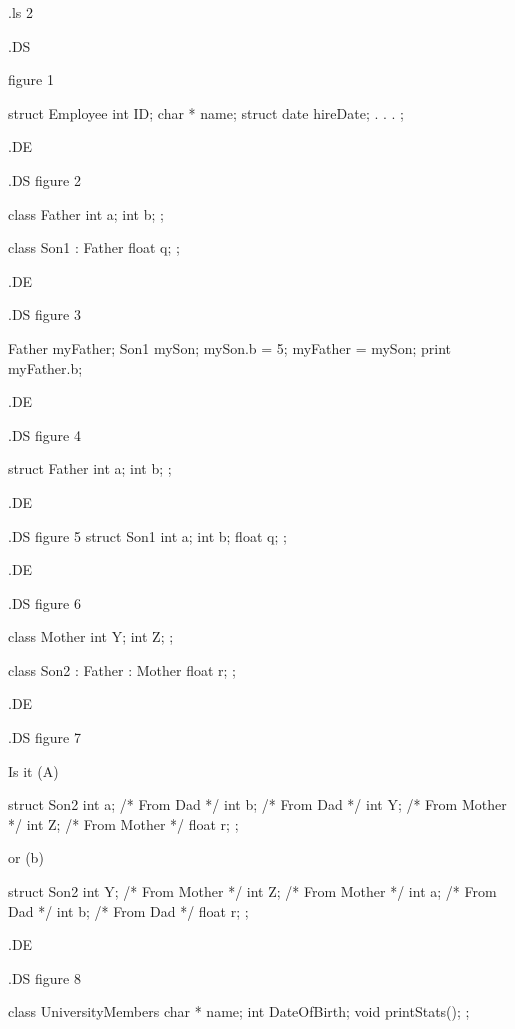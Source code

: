 
.ls 2

.DS

figure 1

struct Employee
    {	int	ID;
	char *	name;
	struct date hireDate;
		.
		.
		.
    }	;

.DE







.DS
figure 2

class Father
    {	int	a;
	int	b;
    }	;


class Son1 : Father
    {	float	q;
    }	;

.DE







.DS
figure 3

Father myFather;
Son1	mySon;
mySon.b = 5;
myFather = mySon;
print myFather.b;

.DE







.DS
figure 4

struct Father
    {	int	a;
	int	b;
    }	;

.DE




.DS
figure 5
struct Son1
    {	int	a;
	int	b;
	float	q;
    }	;

.DE



.DS
figure 6

class Mother
    {
	int	Y;
	int	Z;
    }	;


class Son2 : Father : Mother
    {
	float	r;
    }	;

.DE




.DS
figure 7


Is it (A)

struct Son2
    {
	int	a;	/* From Dad */
	int	b;	/* From Dad */
	int	Y;	/* From Mother */
	int	Z;	/* From Mother */
	float	r;
    }	;

or (b)

struct Son2
    {
	int	Y;	/* From Mother */
	int	Z;	/* From Mother */
	int	a;	/* From Dad */
	int	b;	/* From Dad */
	float	r;
    }	;

.DE



.DS
figure 8  


class UniversityMembers
    {
	char *	name;
	int	DateOfBirth;
	void	printStats();
    }	;

